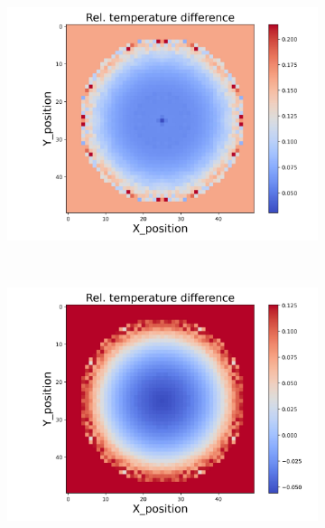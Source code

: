 \begin{figure}[h]
\begin{minipage}{\textwidth}
\begin{subfigure}{0.325\textwidth}
        \end{subfigure}
        \begin{subfigure}{0.325\textwidth}
            \centering
            \includegraphics[width=\textwidth]{figures/raw_data/21/exp/T_bias.jpg}
        \end{subfigure}
    \end{minipage}\\
    \begin{minipage}{\textwidth}
        \centering
        \begin{subfigure}{0.325\textwidth}
            \centering
            \includegraphics[width=\textwidth]{figures/raw_data/22/exp/T_bias.jpg}

\end{subfigure}
\end{minipage}
\end{figure}
